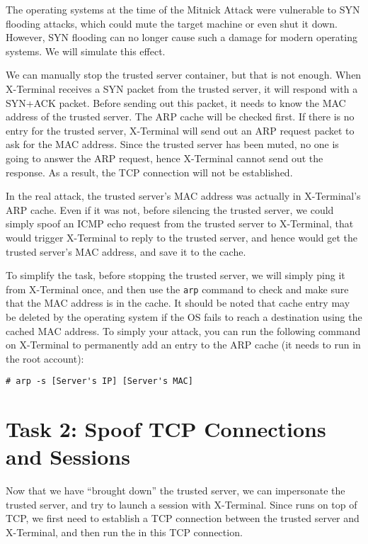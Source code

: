 The operating systems at the time of the Mitnick Attack were vulnerable to SYN
flooding attacks, which could mute the target machine or even shut it down. 
However, SYN flooding can no longer cause such a damage for modern operating systems. 
We will simulate this effect. 

We can manually stop the trusted server container, but that is not enough.
When X-Terminal receives a SYN packet from the trusted server, it will respond with
a SYN+ACK packet. Before sending out this packet, 
it needs to know the MAC address of the trusted server. 
The ARP cache will be checked first. If there is no entry
for the trusted server, X-Terminal will send out an ARP request packet 
to ask for the MAC address. Since the trusted server has been
muted, no one is going to answer the ARP request, hence 
X-Terminal cannot send out the response. As a result, the
TCP connection will not be established. 

In the real attack, the trusted server's MAC address was actually in X-Terminal's ARP
cache. Even if it was not, before silencing the trusted server, 
we could simply spoof an ICMP echo request from the trusted 
server to X-Terminal, that would trigger X-Terminal to reply to 
the trusted server, and hence would get the trusted server's MAC address, and 
save it to the cache. 


To simplify the task, before stopping the trusted server, 
we will simply ping it from X-Terminal once, and then use 
the \texttt{arp} command to check and make sure that
the MAC address is in the cache. It should be noted that 
cache entry may be deleted by the operating system if 
the OS fails to reach a destination using 
the cached MAC address. To simply your attack, 
you can run the following command on X-Terminal to
permanently add an entry to the ARP cache (it needs to
run in the root account):

\begin{lstlisting}
# arp -s [Server's IP] [Server's MAC]
\end{lstlisting}



\section{Task 2: Spoof TCP Connections and \rsh Sessions}
\label{sec:task2}

Now that we have ``brought down'' the trusted server, we can impersonate the trusted
server, and try to launch a \rsh session  
with X-Terminal. Since \rsh runs on top of TCP, we first need to 
establish a TCP connection between the trusted server and X-Terminal,
and then run the \rsh in this TCP connection.  


